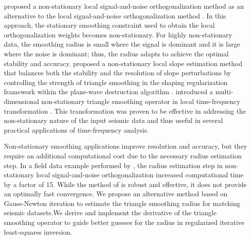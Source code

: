 \cite{chenfomelorthon2021} proposed a non-stationary local signal-and-noise orthogonalization method as an alternative to the local signal-and-noise orthogonalization method \cite[]{chenfomel2015}. In this approach, the stationary smoothing constraint used to obtain the local orthogonalization weights becomes non-stationary. For highly non-stationary data, the smoothing radius is small where the signal is dominant and it is large where the noise is dominant; thus, the radius adapts to achieve the optimal stability and accuracy. 
\cite{wang2021} proposed a non-stationary local slope estimation method that balances both the stability and the resolution of slope perturbations by controlling the strength of triangle smoothing in the shaping regularization framework within the plane-wave destruction algorithm \cite[]{fomel2002}.
\cite{chen2021} introduced a multi-dimensional non-stationary triangle smoothing operator in local time-frequency transformation \cite[]{liufomel2013}. This transformation was proven to be effective in addressing the non-stationary nature of the input seismic data and thus useful in several practical applications of time-frequency analysis. 

Non-stationary smoothing applications improve resolution and accuracy, but they require an additional computational cost due to the necessary radius estimation step.
In a field data example performed by \cite{chenfomelorthon2021}, the radius estimation step in non-stationary local signal-and-noise orthogonalization increased computational time by a factor of 15. 
While the method of \cite{greerfomel2018} is robust and effective, it does not provide an optimally fast convergence. We propose an alternative method based on Gauss-Newton iteration to estimate the triangle smoothing radius for matching seismic datasets.We derive and implement the derivative of the triangle smoothing operator to guide better guesses for the radius in regularized iterative least-squares inversion. 

